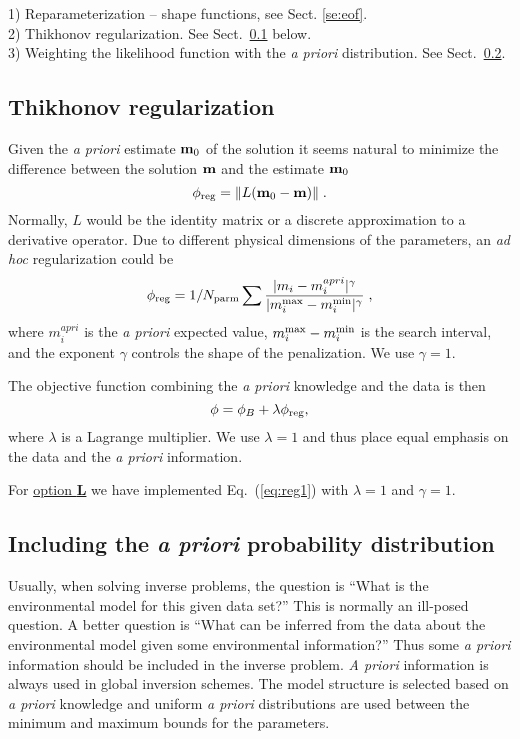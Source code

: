 \documentclass{saclantc}
\begin{document}
1) Reparameterization -- shape functions, see Sect. \ref{se:eof}.\\
2) Thikhonov regularization. See Sect.\ \ref{se:tik} below.\\
3) Weighting the likelihood function with the {\it a priori} distribution.
 See Sect.\ \ref{se:prior}.

\subsection{Thikhonov regularization}
\label{se:tik}

Given the {\it a priori} estimate ${\bf m}_0$ of the solution it seems
natural to minimize the difference between the solution ${\bf m}$
 and the estimate  ${\bf m}_0$
\begin{equation}
\phi_{\rm reg} = \| L({\bf m}_0 -{\bf m}) \| \; .
\end{equation}
Normally, $ L $ would be the identity matrix or a discrete approximation to
a derivative operator. Due to different physical dimensions of the parameters,
an {\it ad hoc} regularization could be
\begin{equation}
\phi_{\rm reg} = 1 / N_{\rm parm}
         \sum \frac{|m_i - m_i^{apri}|^\gamma}
                 {|m_i^{\rm max} - m_i^{\rm min}|^{\gamma}}\; ,
\label{eq:reg}
\end{equation}
where $m_i^{apri}$  is the {\it a priori} expected value,
$m_i^{\rm max} - m_i^{\rm min}$ is the search interval, and the exponent
$\gamma$ controls the shape of the penalization. %
 We use $ \gamma =1$.

The objective function combining the {\it a priori} knowledge and the data is then
\begin{equation}
\phi = \phi_B + \lambda \phi_{\rm reg},
\label{eq:reg1}
\end{equation}
where 
$ \lambda$ is a Lagrange multiplier.  We use $ \lambda=1$ and thus place 
equal emphasis on the data and the {\it a priori} information.

For \underline{option {\bf L}} we have implemented Eq.\ (\ref{eq:reg1}) with  $ \lambda=1$
  and $ \gamma=1$.

\subsection{Including the  {\it a priori} probability distribution}
\label{se:prior}


Usually, when solving inverse problems, the question is ``What is the
environmental model  for this given data set?'' This is normally an ill-posed
question. 
A better question is ``What can be inferred from the
data about the environmental model given some environmental
information?'' Thus 
 some {\it a priori} information should be included in the inverse problem. 
{\it A priori} information is always used in global inversion
schemes. The
model structure is selected based on {\it a
priori} knowledge and uniform {\it a priori}
distributions are used between the minimum and maximum bounds for the
parameters.
\end{document}

